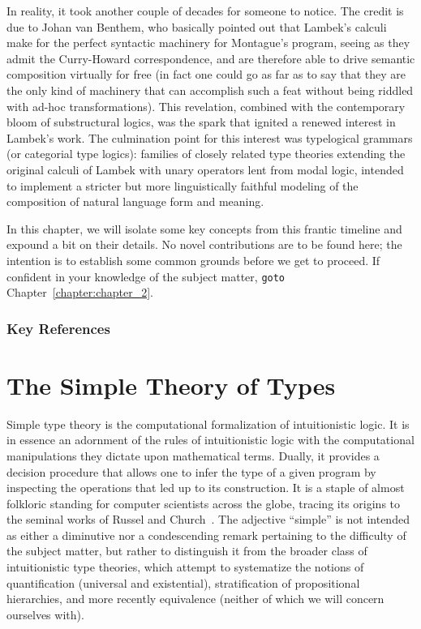 In reality, it took another couple of decades for someone to notice.
The credit is due to Johan van Benthem, who basically pointed out that Lambek's calculi make for the perfect syntactic machinery for Montague's program, seeing as they admit the Curry-Howard correspondence, and are therefore able to drive semantic composition virtually for free (in fact one could go as far as to say that they are the only kind of machinery that can accomplish such a feat without being riddled with ad-hoc transformations).
This revelation, combined with the contemporary bloom of substructural logics, was the spark that ignited a renewed interest in Lambek's work.
The culmination point for this interest was typelogical grammars (or categorial type logics): families of closely related type theories extending the original calculi of Lambek with unary operators lent from modal logic, intended to implement a stricter but more linguistically faithful modeling of the composition of natural language form and meaning.

In this chapter, we will isolate some key concepts from this frantic timeline and expound a bit on their details.
No novel contributions are to be found here; the intention is to establish some common grounds before we get to proceed. 
If confident in your knowledge of the subject matter, \texttt{goto} Chapter~\ref{chapter:chapter_2}.

\subsubsection*{Key References}

\newpage

\section{The Simple Theory of Types}

Simple type theory is the computational formalization of intuitionistic logic. 
It is in essence an adornment of the rules of intuitionistic logic with the computational manipulations they dictate upon mathematical terms.
Dually, it provides a decision procedure that allows one to infer the type of a given program by inspecting the operations that led up to its construction.
It is a staple of almost folkloric standing for computer scientists across the globe, tracing its origins to the seminal works of Russel and Church~\cite{russel1908,church1940}.
The adjective ``simple'' is not intended as either a diminutive nor a condescending remark pertaining to the difficulty of the subject matter, but rather to distinguish it from the broader class of intuitionistic type theories, which attempt to systematize the notions of quantification (universal and existential), stratification of propositional hierarchies, and more recently equivalence (neither of which we will concern ourselves with).

